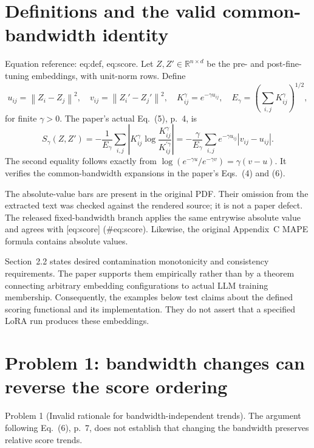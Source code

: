 \documentclass[10pt]{article}
\begin{document}
\section*{Definitions and the valid common-bandwidth identity}
Equation reference: eq:def, eq:score. Let \(Z,Z'\in\mathbb R^{n\times d}\) be the pre- and post-fine-tuning embeddings, with unit-norm rows. Define \[
u_{ij}=\left\lVert Z_i-Z_j\right\rVert^2,\quad
v_{ij}=\left\lVert Z_i'-Z_j'\right\rVert^2,\quad
K^\gamma_{ij}=e^{-\gamma u_{ij}},\quad
E_\gamma=\left(\sum_{i,j}K^\gamma_{ij}\right)^{1/2},\] for finite \(\gamma>0\). The paper’s actual Eq. (5), p. 4, is \[
S_\gamma(Z,Z')
=-\frac{1}{E_\gamma}
  \sum_{i,j}\left|K^\gamma_{ij}
       \log\frac{K^\gamma_{ij}}{K^{\prime\gamma}_{ij}}\right|
=-\frac{\gamma}{E_\gamma}
  \sum_{i,j}e^{-\gamma u_{ij}}\left|v_{ij}-u_{ij}\right|.\] The second equality follows exactly from \(\log(e^{-\gamma u}/e^{-\gamma v})=\gamma(v-u)\). It verifies the common-bandwidth expansions in the paper’s Eqs. (4) and (6).\par
The absolute-value bars are present in the original PDF. Their omission from the extracted text was checked against the rendered source; it is not a paper defect. The released fixed-bandwidth branch applies the same entrywise absolute value and agrees with [eq:score] (\#eq:score). Likewise, the original Appendix C MAPE formula contains absolute values.\par
Section 2.2 states desired contamination monotonicity and consistency requirements. The paper supports them empirically rather than by a theorem connecting arbitrary embedding configurations to actual LLM training membership. Consequently, the examples below test claims about the defined scoring functional and its implementation. They do not assert that a specified LoRA run produces these embeddings.\par
\section*{Problem 1: bandwidth changes can reverse the score ordering}
Problem 1 (Invalid rationale for bandwidth-independent trends).  The argument following Eq. (6), p. 7, does not establish that changing the bandwidth preserves relative score trends.\par
\end{document}
